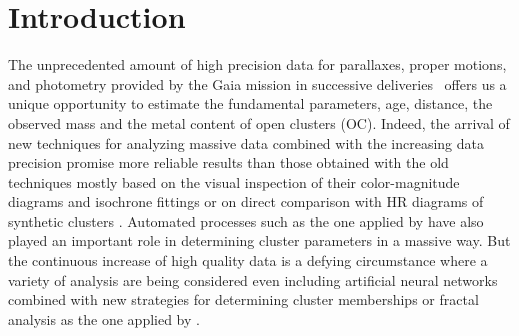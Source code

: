 \documentclass[draft]{aa}
\begin{document}

\maketitle


\section{Introduction}

 The unprecedented amount of high precision data for parallaxes, proper motions,
 and photometry provided by the Gaia mission in successive
 deliveries~\citep[DR2 and EDR3,][]{Gaia_2016,Gaia_EDR3} offers us a unique
 opportunity to estimate the fundamental parameters, age, distance, the observed
 mass and the metal content of open clusters (OC).
 Indeed, the arrival of new techniques for
 analyzing massive data combined with the increasing data precision promise
 more reliable results than those obtained with the old techniques mostly
 based on the visual inspection of their color-magnitude diagrams and
 isochrone fittings \citep{Phelps1994} or on direct comparison with HR diagrams
 of synthetic clusters \citep{Siess1997}. Automated processes such as the one
 applied by \cite{Kharchenko_2012} have also played an important role in
 determining cluster parameters in a massive way. But the continuous increase
 of high quality data is a defying circumstance where a variety of analysis are
 being considered even including artificial neural networks
 \citep{Cantat_2020} combined with new strategies for determining cluster
 memberships \citep{Krone2014,Cantat2018} or fractal analysis as the one applied
 by \citep{Gregorio_2015}.
\end{document}
